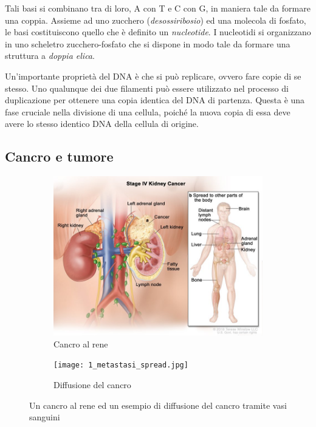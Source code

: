 Tali basi si combinano tra di loro, A con T e C con G, in maniera tale da formare una coppia. Assieme ad uno zucchero (\textit{desossiribosio}) ed una molecola di fosfato, le basi costituiscono quello che è definito un \textit{nucleotide}. I nucleotidi si organizzano in uno scheletro zucchero-fosfato che si dispone in modo tale da formare una struttura a \textit{doppia elica}.

Un'importante proprietà del DNA è che si può replicare, ovvero fare copie di se stesso. Uno qualunque dei due filamenti può essere utilizzato nel processo di duplicazione per ottenere una copia identica del DNA di partenza. Questa è una fase cruciale nella divisione di una cellula, poiché la nuova copia di essa deve avere lo stesso identico DNA della cellula di origine.

\subsection{Cancro e tumore}
\label{chap:intro-biology-cancer}

\begin{figure}[h]
    \begin{subfigure}[b]{.5 \textwidth}
        \centering
        \includegraphics[width=0.75 \textwidth]{Images/1_tumor.jpg}
        \caption{\small Cancro al rene}
        \label{fig:kidney-cancer}
    \end{subfigure}%
    \begin{subfigure}[b]{.5 \textwidth}
        \centering
        \texttt{[image: 1\_metastasi\_spread.jpg]}
        \caption{\small Diffusione del cancro}
        \label{fig:metastasi}
    \end{subfigure}
    \caption{Un cancro al rene ed un esempio di diffusione del cancro tramite vasi sanguini}
\end{figure}

